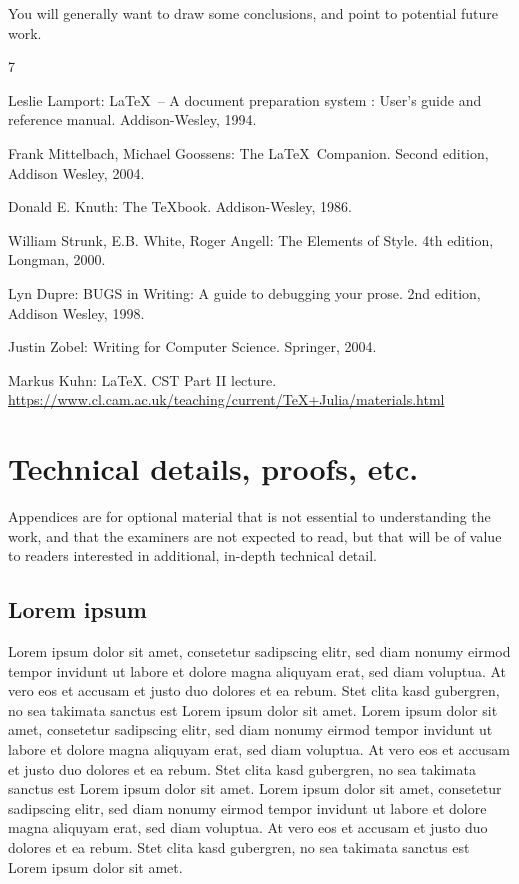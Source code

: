 \documentclass[12pt,a4paper,twoside]{report}
\begin{document}
You will generally want to draw some conclusions, and point to
potential future work.

\label{lastcontentpage} %

\begin{thebibliography}{7} %

Leslie Lamport: \LaTeX\ -- A document preparation
system : User's guide and reference manual. Addison-Wesley, 1994.

 Frank Mittelbach, Michael Goossens: The \LaTeX\
Companion. Second edition, Addison Wesley, 2004.

 Donald E. Knuth: The \TeX book. Ad\-dison-Wesley,
  1986.

 William Strunk, E.B. White, Roger Angell: The Elements
of Style. 4th edition, Longman, 2000.

 Lyn Dupre: BUGS in Writing: A guide to debugging your
prose. 2nd edition, Addison Wesley, 1998.

 Justin Zobel: Writing for Computer Science. Springer,
2004.

 Markus Kuhn: \LaTeX. CST Part II lecture.\\
\url{https://www.cl.cam.ac.uk/teaching/current/TeX+Julia/materials.html}

\end{thebibliography}

\appendix

\chapter{Technical details, proofs, etc.}

Appendices are for optional material that is not essential to
understanding the work, and that the examiners are not expected to
read, but that will be of value to readers interested in additional,
in-depth technical detail.

\section{Lorem ipsum}

Lorem ipsum dolor sit amet, consetetur sadipscing elitr, sed diam
nonumy eirmod tempor invidunt ut labore et dolore magna aliquyam erat,
sed diam voluptua. At vero eos et accusam et justo duo dolores et ea
rebum. Stet clita kasd gubergren, no sea takimata sanctus est Lorem
ipsum dolor sit amet. Lorem ipsum dolor sit amet, consetetur
sadipscing elitr, sed diam nonumy eirmod tempor invidunt ut labore et
dolore magna aliquyam erat, sed diam voluptua. At vero eos et accusam
et justo duo dolores et ea rebum. Stet clita kasd gubergren, no sea
takimata sanctus est Lorem ipsum dolor sit amet. Lorem ipsum dolor sit
amet, consetetur sadipscing elitr, sed diam nonumy eirmod tempor
invidunt ut labore et dolore magna aliquyam erat, sed diam voluptua.
At vero eos et accusam et justo duo dolores et ea rebum. Stet clita
kasd gubergren, no sea takimata sanctus est Lorem ipsum dolor sit
amet.
\end{document}
